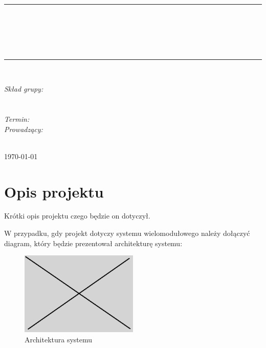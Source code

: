 \documentclass[10pt, a4paper]{article}
\begin{document}
\def\tablename{Tabela}	%

\begin{titlepage}
	\begin{center}
		\textsc{\LARGE \formakursu}\\[1cm]		
		\textsc{\Large \kurs}\\[0.5cm]		
		\rule{\textwidth}{0.08cm}\\[0.4cm]
		{\huge \bfseries \doctype}\\[1cm]
		{\huge \bfseries \projectname}\\[0.5cm]
		{\huge \bfseries \acronim}\\[0.4cm]
		\rule{\textwidth}{0.08cm}\\[1cm]
		
		\begin{flushright} \large
		\emph{Skład grupy:}\\
		\osobaA\\
		\osobaB\\[0.4cm]
		
		\emph{Termin: }\termin\\[0.4cm]

		\emph{Prowadzący:} \\
		\prowadzacy \\
		
		\end{flushright}
		
		\vfill
		
		{\large \today}
	\end{center}	
\end{titlepage}

\newpage
\tableofcontents
\newpage

\section{Opis projektu}
\label{sec:OpisProjektu}

Krótki opis projektu czego będzie on dotyczył.

W przypadku, gdy projekt dotyczy systemu 
wielomodułowego należy dołączyć diagram, który będzie prezentował
architekturę systemu:

\begin{figure}[H]
	\centering
	\includegraphics[width=0.5\textwidth]{figures/obraz.png}
	\caption{Architektura systemu}
	\label{fig:Architektura}
\end{figure}
\end{document}
